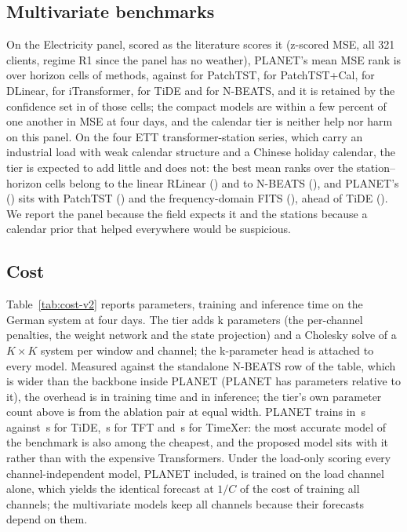 \subsection{Multivariate benchmarks}
\label{sec:bench}
On the Electricity panel, scored as the literature scores it (z-scored MSE, all 321 clients,
regime R1 since the panel has no weather), PLANET's mean MSE rank is
 over  horizon cells of
 methods, against  for PatchTST,
 for PatchTST+Cal,  for DLinear,
 for iTransformer,  for TiDE and
 for N-BEATS, and it is retained by the confidence set in
 of those cells; the compact models are within a few percent of one
another in MSE at four days, and the calendar tier is neither help nor harm on this panel. On
the four ETT transformer-station series, which carry an industrial load with weak calendar
structure and a Chinese holiday calendar, the tier is expected to add little and does not: the
best mean ranks over the  station--horizon cells belong to the linear RLinear
() and to N-BEATS (), and PLANET's
() sits with PatchTST () and the
frequency-domain FITS (), ahead of TiDE ().
We report the panel because the field expects it and the stations because a calendar prior
that helped everywhere would be suspicious.

\subsection{Cost}
\label{sec:cost}
Table~\ref{tab:cost-v2} reports parameters, training and inference time on the German
system at four days. The tier adds k parameters (the per-channel
penalties, the weight network and the state projection) and a Cholesky solve of a $K\times K$
system per window and channel; the k-parameter head is attached to
every model. Measured against the standalone N-BEATS row of the table, which is wider than the backbone
inside PLANET (PLANET has  parameters relative to it),
the overhead is  in training time and
 in inference; the tier's own parameter count above is
from the ablation pair at equal width. PLANET trains in
\,s against \,s for TiDE,
\,s for TFT and \,s for TimeXer: the
most accurate model of the benchmark is also among the cheapest, and the proposed model sits
with it rather than with the expensive Transformers. Under the load-only scoring every
channel-independent model, PLANET included, is trained on the load channel alone, which
yields the identical forecast at $1/C$ of the cost of training all channels; the multivariate
models keep all channels because their forecasts depend on them.
